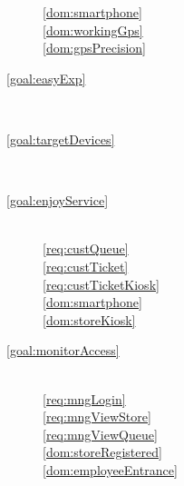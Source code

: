 \begin{description}
        \ref{dom:smartphone}  ~\\
        \ref{dom:workingGps}  ~\\
        \ref{dom:gpsPrecision}  ~\\


        \item[\ref{goal:easyExp}]  ~\\



        \item[\ref{goal:targetDevices}]  ~\\



        \item[\ref{goal:enjoyService}]  ~\\

        \ref{req:custQueue}  ~\\
        \ref{req:custTicket}  ~\\
        \ref{req:custTicketKiosk}  ~\\

        \ref{dom:smartphone}  ~\\
        \ref{dom:storeKiosk}  ~\\


        \item[\ref{goal:monitorAccess}]  ~\\

        \ref{req:mngLogin}  ~\\
        \ref{req:mngViewStore}  ~\\
        \ref{req:mngViewQueue}  ~\\

        \ref{dom:storeRegistered}  ~\\
        \ref{dom:employeeEntrance}  ~\\


\end{description}
